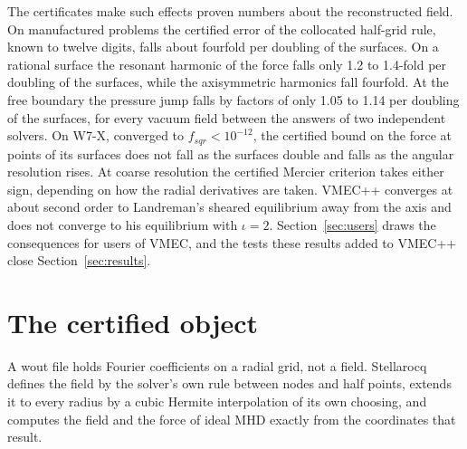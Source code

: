 \documentclass[11pt]{article}
\begin{document}
The certificates make such effects proven numbers about the reconstructed field.
On manufactured problems the certified error of the collocated half-grid rule,
known to twelve digits, falls about fourfold per doubling of the surfaces. On a
rational surface the resonant harmonic of the force falls only 1.2 to 1.4-fold
per doubling of the surfaces, while the axisymmetric harmonics fall fourfold. At
the free boundary the pressure jump falls by factors of only 1.05 to 1.14 per
doubling of the surfaces, for every vacuum field between the answers of two
independent solvers. On W7-X, converged to $f_{sqr}<10^{-12}$, the certified
bound on the force at points of its surfaces does not fall as the surfaces
double and falls as the angular resolution rises. At coarse resolution the certified
Mercier criterion takes either sign, depending on how the radial derivatives are
taken. VMEC++ converges at about second order to Landreman's sheared
equilibrium away from the axis and does not converge to his equilibrium with
$\iota=2$. Section~\ref{sec:users} draws the consequences for users of VMEC,
and the tests these results added to VMEC++ close Section~\ref{sec:results}.

\section{The certified object}\label{sec:object}

A wout file holds Fourier coefficients on a radial grid, not a field.
Stellarocq defines the field by the solver's own rule between nodes and half
points, extends it to every radius by a cubic Hermite interpolation of its own
choosing, and computes the field and the force of ideal MHD exactly from the
coordinates that result.
\end{document}
